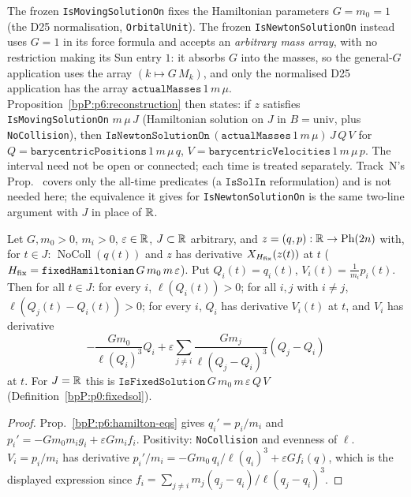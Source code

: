 \begin{remark}\label{bpP:p6:units}
The frozen \texttt{IsMovingSolutionOn} fixes the Hamiltonian parameters $G=m_0=1$ (the D25 normalisation, \texttt{OrbitalUnit}). The frozen \texttt{IsNewtonSolutionOn} instead uses $G=1$ in its force formula and accepts an \emph{arbitrary mass array}, with no restriction making its Sun entry $1$: it absorbs $G$ into the masses, so the general-$G$ application uses the array $(k\mapsto G\,M_k)$, and only the normalised D25 application has the array $\texttt{actualMasses}\,1\,m\,\mu$. Proposition~\ref{bpP:p6:reconstruction} then states: if $z$ satisfies \texttt{IsMovingSolutionOn} $m\,\mu\,J$ (Hamiltonian solution on $J$ in $B=\text{univ}$, plus \texttt{NoCollision}), then $\texttt{IsNewtonSolutionOn}\,(\texttt{actualMasses}\,1\,m\,\mu)\,J\,Q\,V$ for $Q=\texttt{barycentricPositions}\,1\,m\,\mu\,q$, $V=\texttt{barycentricVelocities}\,1\,m\,\mu\,p$. The interval need not be open or connected; each time is treated separately. Track~N's Prop.~ covers only the all-time predicates (a $\texttt{IsSolIn}$ reformulation) and is not needed here; the equivalence it gives for \texttt{IsNewtonSolutionOn} is the same two-line argument with $J$ in place of $\mathbb{R}$.
\end{remark}

\begin{proposition}\label{bpP:p6:reconstruction-fixed}
Let $G,m_0>0$, $m_i>0$, $\varepsilon\in\mathbb{R}$, $J\subset\mathbb{R}$ arbitrary, and $z=(q,p):\mathbb{R}\to\mathrm{Ph}(2n)$ with, for $t\in J$: $\operatorname{NoColl}(q(t))$ and $z$ has derivative $X_{H_{\rm fix}}(z(t))$ at $t$ ($H_{\rm fix}=\texttt{fixedHamiltonian}\,G\,m_0\,m\,\varepsilon$). Put $Q_i(t)=q_i(t)$, $V_i(t)=\frac1{m_i}p_i(t)$. Then for all $t\in J$: for every $i$, $\ell(Q_i(t))>0$; for all $i,j$ with $i\ne j$, $\ell(Q_j(t)-Q_i(t))>0$; for every $i$, $Q_i$ has derivative $V_i(t)$ at $t$, and $V_i$ has derivative
\[-\frac{Gm_0}{\ell(Q_i)^3}Q_i+\varepsilon\sum_{j\ne i}\frac{Gm_j}{\ell(Q_j-Q_i)^3}(Q_j-Q_i)\]
at $t$. For $J=\mathbb{R}$ this is $\texttt{IsFixedSolution}\,G\,m_0\,m\,\varepsilon\,Q\,V$ (Definition~\ref{bpP:p0:fixedsol}).
\end{proposition}
\begin{proof}
\label{stepP:p6:rf-eq} Prop.~\ref{bpP:p6:hamilton-eqs} gives $q_i'=p_i/m_i$ and $p_i'=-Gm_0m_ig_i+\varepsilon Gm_if_i$. Positivity: \texttt{NoCollision} and evenness of $\ell$. $V_i=p_i/m_i$ has derivative $p_i'/m_i=-Gm_0\,q_i/\ell(q_i)^3+\varepsilon Gf_i(q)$, which is the displayed expression since $f_i=\sum_{j\ne i}m_j(q_j-q_i)/\ell(q_j-q_i)^3$.
\end{proof}

